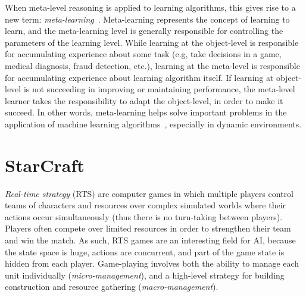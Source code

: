 When meta-level reasoning is applied to learning algorithms, this gives rise to a new term: \textit{meta-learning}~\cite{schweighofer2003meta, doya2002metalearning}.
Meta-learning represents the concept of learning to learn, and the meta-learning level is generally responsible for controlling the parameters of the learning level.
While learning at the object-level is responsible for accumulating experience about some task (e.g, take decisions in a game, medical diagnosis, fraud detection, etc.), learning at the meta-level is responsible for accumulating experience about learning algorithm itself. 
If learning at object-level is not succeeding in improving or maintaining performance, the meta-level learner takes the responsibility to adapt the object-level, in order to make it succeed.
In other words, meta-learning helps solve important problems in the application of machine learning algorithms~\cite{vilalta2004using}, especially in dynamic environments.



\section{StarCraft}
\label{sec:sc}

\emph{Real-time strategy} (RTS) are computer games in which multiple players control teams of characters and resources over complex simulated worlds where their actions occur simultaneously (thus there is no turn-taking between players). 
Players often compete over limited resources in order to strengthen their team and win the match. 
As such, RTS games are an interesting field for AI, because the state space is huge, actions are concurrent, and part of the game state is hidden from each player. 
Game-playing involves both the ability to manage each unit individually (\textit{micro-management}), and a high-level strategy for building construction and resource gathering (\textit{macro-management}). 

